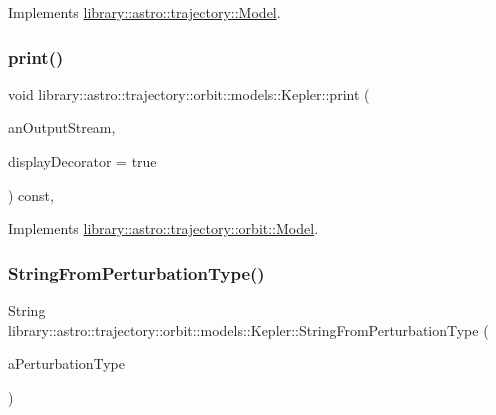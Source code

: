 Implements \hyperlink{classlibrary_1_1astro_1_1trajectory_1_1_model_a83c52eb23e8feea58d600c87700ed923}{library\+::astro\+::trajectory\+::\+Model}.

\mbox{\label{classlibrary_1_1astro_1_1trajectory_1_1orbit_1_1models_1_1_kepler_a5cecedfe1b2002881b4ef6eeae64af93}} 
\subsubsection{\texorpdfstring{print()}{print()}}
{\footnotesize\ttfamily void library\+::astro\+::trajectory\+::orbit\+::models\+::\+Kepler\+::print (\begin{DoxyParamCaption}\item[{std\+::ostream \&}]{an\+Output\+Stream,  }\item[{bool}]{display\+Decorator = {\ttfamily true} }\end{DoxyParamCaption}) const\hspace{0.3cm}{\ttfamily [override]}, {\ttfamily [virtual]}}



Implements \hyperlink{classlibrary_1_1astro_1_1trajectory_1_1orbit_1_1_model_abd4fb7604274cc8b3589a445db64e98c}{library\+::astro\+::trajectory\+::orbit\+::\+Model}.

\mbox{\label{classlibrary_1_1astro_1_1trajectory_1_1orbit_1_1models_1_1_kepler_a0ab0792e822cf9586d55fa17e3950d87}} 
\subsubsection{\texorpdfstring{String\+From\+Perturbation\+Type()}{StringFromPerturbationType()}}
{\footnotesize\ttfamily String library\+::astro\+::trajectory\+::orbit\+::models\+::\+Kepler\+::\+String\+From\+Perturbation\+Type (\begin{DoxyParamCaption}\item[{const \hyperlink{classlibrary_1_1astro_1_1trajectory_1_1orbit_1_1models_1_1_kepler_a7f34995d6f287de65a6edb2d419a2fe0}{Kepler\+::\+Perturbation\+Type} \&}]{a\+Perturbation\+Type }\end{DoxyParamCaption})\hspace{0.3cm}{\ttfamily [static]}}




